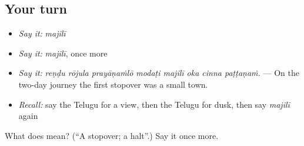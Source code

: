 \subsection*{Your turn}
\begin{itemize}
\raggedright
  \item \emph{Say it:} \emph{majilī}
  \item \emph{Say it:} \emph{majilī}, once more
  \item \emph{Say it:} \emph{reṇḍu rōjula prayāṇaṁlō modaṭi majilī oka cinna paṭṭaṇaṁ.} — On the two-day journey the first stopover was a small town.
  \item \emph{Recall:} say the Telugu for a view, then the Telugu for dusk, then say \emph{majilī} again
\end{itemize}

\begin{tcolorbox}[breakable,colback=teal!4,colframe=teal!35!black,title={Before you move on}]
What does  mean? (\textquotedblleft{}A stopover; a halt\textquotedblright{}.) Say it once more.
\end{tcolorbox}
